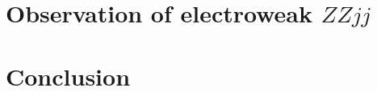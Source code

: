 \documentclass{PoS}
\begin{document}
\section{Observation of electroweak $ZZjj$}
\label{sec:ewk}


\section{Conclusion}
\label{sec:conclusion}


%


\end{document}
